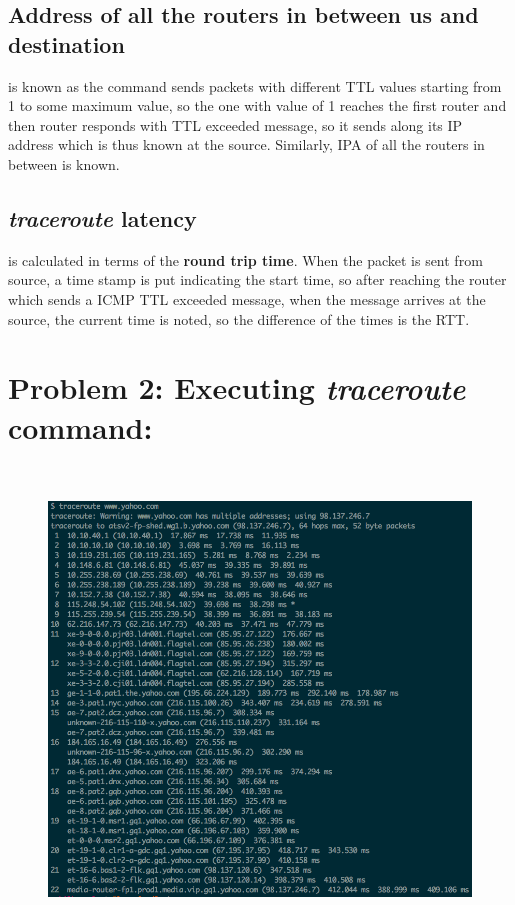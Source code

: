 \documentclass[]{report}
\begin{document}
\subsection{Address of all the routers in between us and destination}
is known as the command sends packets with different TTL values starting from 1 to some maximum value, so the one with value of 1 reaches the first router and then router responds with TTL exceeded message, so it sends along its IP address which is thus known at the source. Similarly, IPA of all the routers in between is known. 

\subsection{\textit{traceroute} latency}
is calculated in terms of the \textbf{round trip time}. When the packet is sent from source, a time stamp is put indicating the start time, so after reaching the router which sends a ICMP TTL exceeded message, when the message arrives at the source, the current time is noted, so the difference of the times is the RTT.

\section{Problem 2:  Executing \textit{traceroute} command: }
\begin{figure}[H]
	\vspace{0pt}
	\includegraphics[height = 350pt, keepaspectratio]{Snapshots/exe2/exe2_2.png}
\end{figure}
\end{document}
